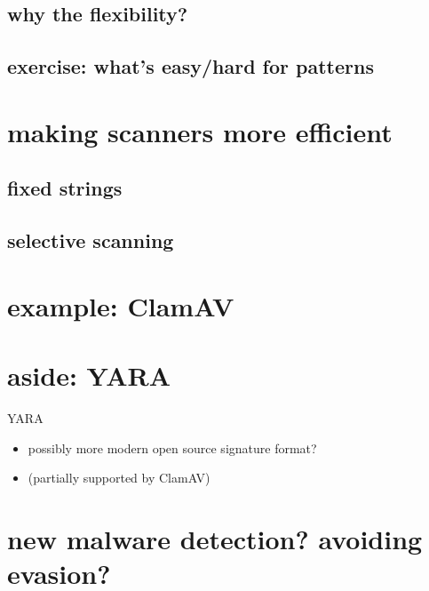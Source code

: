 \subsection{why the flexibility?}

\subsection{exercise: what's easy/hard for patterns}


\section{making scanners more efficient}


\subsection{fixed strings}


\subsection{selective scanning}


\section{example: ClamAV}


\section{aside: YARA}
\begin{frame}{YARA}
    \begin{itemize}
    \item possibly more modern open source signature format?
    \item (partially supported by ClamAV)
    \end{itemize}
\end{frame}

\section{new malware detection? avoiding evasion?}


